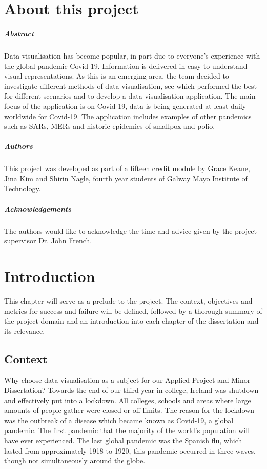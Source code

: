 
\chapter*{About this project}
\paragraph{Abstract}
Data visualisation has become popular, in part due to everyone's experience with the global pandemic Covid-19. Information is delivered in easy to understand visual representations. As this is an emerging area, the team decided to investigate different methods of data visualisation, see which performed the best for different scenarios and to develop a data visualisation application. The main focus of the application is on Covid-19, data is being generated at least daily worldwide for Covid-19. The application includes examples of other pandemics such as SARs, MERs and historic epidemics of smallpox and polio.

\paragraph{Authors}
This project was developed as part of a fifteen credit module by Grace Keane, Jina Kim and Shirin Nagle, fourth year students of Galway Mayo Institute of Technology.

\paragraph{Acknowledgements} The authors would like to acknowledge the time and advice given by the project supervisor Dr. John French.

\chapter{Introduction}
This chapter will serve as a prelude to the project. The context, objectives and metrics for success and failure will be defined, followed by a thorough summary of the project domain and an introduction into each chapter of the dissertation and its relevance.

\section{Context}
Why choose data visualisation as a subject for our Applied Project and Minor Dissertation? Towards the end of our third year in college, Ireland was shutdown and effectively put into a lockdown. All colleges, schools and areas where large amounts of people gather were closed or off limits. The reason for the lockdown was the outbreak of a disease which became known as Covid-19, a global pandemic. The first pandemic that the majority of the world's population will have ever experienced. The last global pandemic was the Spanish flu, which lasted from approximately 1918 to 1920, this pandemic occurred in three waves, though not simultaneously around the globe.\cite{Spanishflu}\\

